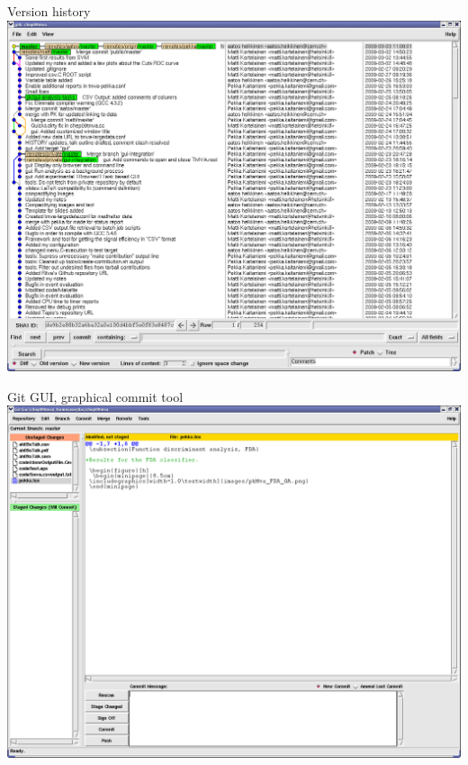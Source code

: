 \documentclass[final,hyperref={pdfpagelabels=false},notitlepage=true]{beamer}
\begin{document}
\begin{frame}{}
\begin{columns}[t]
\begin{column}{0.45\linewidth}
    \begin{block}{\large Version history}
      \includegraphics[scale=1.0]{images/gitk-history.png}
    \end{block}

    \begin{block}{\large Git GUI, graphical commit tool}
      \includegraphics[scale=1.0]{images/gui-screenshot.png}
    \end{block}


\end{column}
\end{columns}
\end{frame}
\end{document}
